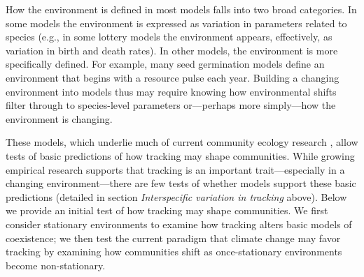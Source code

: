 \documentclass[11pt,letterpaper]{article}
\begin{document}
How the environment is defined in most models falls into two broad categories. In some models the environment is expressed as variation in parameters related to species (e.g., in some lottery models the environment appears, effectively, as variation in birth and death rates). In other models, the environment is more specifically defined. For example, many seed germination models define an environment that begins with a resource pulse each year. Building a changing environment into models thus may require knowing how environmental shifts filter through to species-level parameters \citep{Tuljapurkar2009} or---perhaps more simply---how the environment is changing. %

These models, which underlie much of current community ecology research \citep{Mayfield:2010fe,barabas2018,ellner2019}, allow tests of basic predictions of how tracking may shape communities. While growing empirical research supports that tracking is an important trait---especially in a changing environment---there are few tests of whether models support these basic predictions (detailed in section \emph{Interspecific variation in tracking} above). Below we provide an initial test of how tracking may shape communities. We first consider stationary environments to examine how tracking alters basic models of coexistence; we then test the current paradigm that climate change may favor tracking by examining how communities shift as once-stationary environments become non-stationary.
\end{document}
